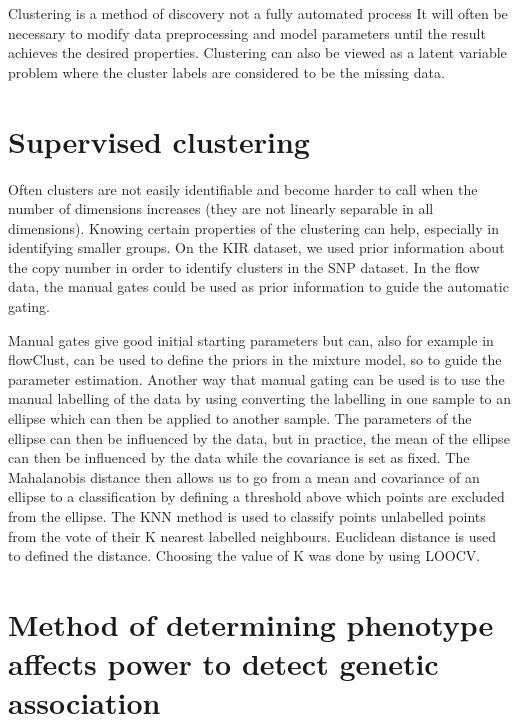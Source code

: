Clustering is a method of discovery not a fully automated process
It will often be necessary to modify data preprocessing and model parameters until the result achieves the desired properties.  
Clustering can also be viewed as a latent variable problem where the cluster labels are considered to be the missing data.



\section{Supervised clustering}

Often clusters are not easily identifiable and become harder to call when the number of dimensions increases (they are not linearly separable in all dimensions).
Knowing certain properties of the clustering can help, especially in identifying smaller groups.
On the KIR dataset, we used prior information about the copy number in order to identify clusters in the SNP dataset.
In the flow data, the manual gates could be used as prior information to guide the automatic gating.

Manual gates give good initial starting parameters but can, also for example in flowClust, can be used to define the priors in the mixture model,
so to guide the parameter estimation.
Another way that manual gating can be used is to use the manual labelling of the data by using converting the labelling in one sample to an ellipse which can then be applied to another sample.
The parameters of the ellipse can then be influenced by the data, but in practice, the mean of the ellipse can then be influenced by the data while the covariance is set as fixed.
The Mahalanobis distance then allows us to go from a mean and covariance of an ellipse to a classification by defining a threshold above which points are excluded from the ellipse.
The KNN method is used to classify points unlabelled points from the vote of their K nearest labelled neighbours.
Euclidean distance is used to defined the distance.
Choosing the value of K was done by using LOOCV.


\section{ Method of determining phenotype affects power to detect genetic association }


